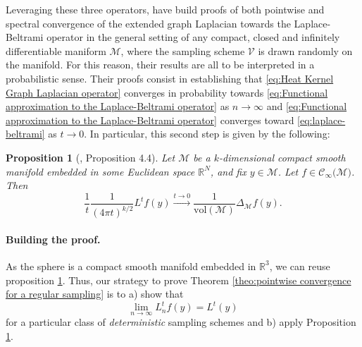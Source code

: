 \documentclass{article} %
\newtheorem{definition}{Definition}[section]
\newtheorem{prop}{Proposition}
\newcommand{\V}{\mathcal{V}}  %
\begin{document}
Leveraging these three operators, \citet{belkin2005towards, belkin2007convergence} have build proofs of both pointwise and spectral convergence of the extended graph Laplacian towards the Laplace-Beltrami operator in the general setting of any compact, closed and infinitely differentiable maniform $\mathcal M$, where the sampling scheme $\V$ is drawn randomly on the manifold. For this reason, their results are all to be interpreted in a probabilistic sense.
Their proofs consist in establishing that \eqref{eq:Heat Kernel Graph Laplacian operator} converges in probability towards \eqref{eq:Functional approximation to the Laplace-Beltrami operator} as $n\rightarrow \infty$ and \eqref{eq:Functional approximation to the Laplace-Beltrami operator} converges toward \eqref{eq:laplace-beltrami} as $t\rightarrow 0$. In particular, this second step is given by the following:
\begin{prop}
[\citet{belkin2005towards}, Proposition 4.4]
Let $\mathcal{M}$ be a $k$-dimensional compact smooth manifold embedded in some Euclidean space $\mathbb{R}^N$, and fix $y\in\mathcal{M}$. Let $f\in\mathcal{C}_\infty(\mathcal{M)}$. Then
\begin{equation}
\frac{1}{t}\frac{1}{(4\pi t)^{k/2}} L^tf(y) \xrightarrow{t\to 0 } \frac{1}{\text{vol}(\mathcal M)}\Delta_{\mathcal M}f(y).
\end{equation}
\label{prop:3}
\end{prop}

\paragraph{Building the proof.}
As the sphere is a compact smooth manifold embedded in $\mathbb{R}^3$, we can reuse proposition \ref{prop:3}. Thus, our strategy to prove Theorem \ref{theo:pointwise convergence for a regular sampling} is to a) show that
\begin{equation}\label{eq:continuous convergence}
 \lim_{n\to\infty}L_n^{t} f(y) =  L^t(y)
\end{equation}
for a particular class of \emph{deterministic} sampling schemes and b) apply Proposition \ref{prop:3}.


\end{document}
